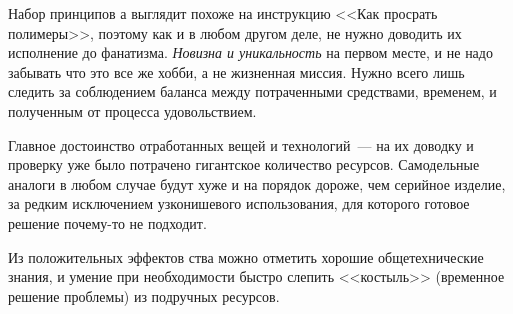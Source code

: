\documentclass{magazine}
\begin{document}
Набор принципов \scr а выглядит похоже на инструкцию <<Как просрать полимеры>>,
поэтому как и в любом другом деле, не нужно доводить их исполнение до фанатизма.
\emph{Новизна и уникальность} на первом месте, и не надо забывать что это все же
хобби, а не жизненная миссия. Нужно всего лишь следить за соблюдением баланса
между потраченными средствами, временем, и полученным от процесса удовольствием.

Главное достоинство отработанных вещей и технологий\ --- на их доводку и
проверку уже было потрачено гигантское количество ресурсов. Самодельные аналоги
в любом случае будут хуже и на порядок дороже, чем серийное изделие, за редким
исключением узконишевого использования, для которого готовое решение почему-то
не подходит.

Из положительных эффектов \scr ства можно отметить хорошие общетехнические
знания, и умение при необходимости быстро слепить <<костыль>> (временное решение
проблемы) из подручных ресурсов.
\end{document}
